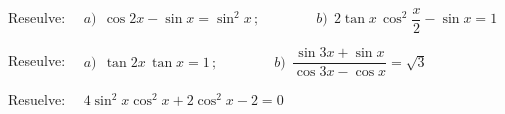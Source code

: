 \vspace{-8mm}
\begin{flushright}
\begin{footnotesize} \textcolor{gris}{}	\end{footnotesize}
\end{flushright}


\begin{mipropuesto}

Reseulve: $\quad a)\ \ \cos 2 x -\sin x=\sin^2 x\, ;\qquad \qquad b)\ \ 2\tan x \, \cos^2 \dfrac x 2 -\sin x=1$

\end{mipropuesto}

\vspace{-8mm}
\begin{flushright}
\begin{footnotesize} \textcolor{gris}{}	\end{footnotesize}
\end{flushright}


\begin{mipropuesto}

Reseulve: $\quad a)\ \ \tan 2x \, \tan x=1\, ;\qquad \qquad b)\ \ \dfrac{\sin 3x+\sin x}{\cos 3x-\cos x}=\sqrt{3}$ 

\end{mipropuesto}

\vspace{-8mm}
\begin{flushright}
\begin{footnotesize} \textcolor{gris}{}	\end{footnotesize}
\end{flushright}

\begin{mipropuesto}

Resuelve: $ \quad 4	\sin^2 x \cos^2 x+2\cos^2 x-2=0$

\end{mipropuesto}

\vspace{-8mm}
\begin{flushright}
\begin{footnotesize} \textcolor{gris}{}	\end{footnotesize}
\end{flushright}

